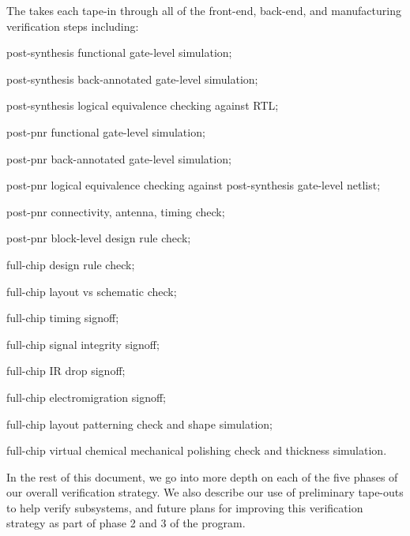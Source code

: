 \begin{cbxlist}{1.5em}{1em}{1em}
\begin{cbxlist}[--]{1.5em}{0em}{0em}
    \end{cbxlist}

 \item The  takes each
    tape-in through all of the front-end, back-end, and manufacturing
    verification steps including:

    \smallskip
    \begin{cbxlist}[--]{1.5em}{0em}{0em}
      \raggedright

      \item post-synthesis functional gate-level simulation;
      \item post-synthesis back-annotated gate-level simulation;
      \item post-synthesis logical equivalence checking against RTL;
      \item post-pnr functional gate-level simulation;
      \item post-pnr back-annotated gate-level simulation;
      \item post-pnr logical equivalence checking against post-synthesis
         gate-level netlist;
      \item post-pnr connectivity, antenna, timing check;
      \item post-pnr block-level design rule check;
      \item full-chip design rule check;
      \item full-chip layout vs schematic check;
      \item full-chip timing signoff;
      \item full-chip signal integrity signoff;
      \item full-chip IR drop signoff;
      \item full-chip electromigration signoff;
      \item full-chip layout patterning check and shape simulation;
      \item full-chip virtual chemical mechanical polishing check and
         thickness simulation.

    \end{cbxlist}

\end{cbxlist}

\medskip\noindent
In the rest of this document, we go into more depth on each of the
five phases of our overall verification strategy. We also describe our
use of preliminary tape-outs to help verify subsystems, and future plans
for improving this verification strategy as part of phase 2 and 3 of the
program.
